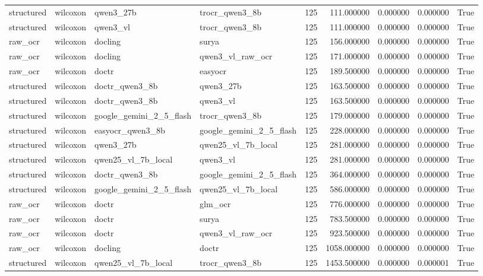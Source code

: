 \begin{tabular}{llllrrrrr}
structured & wilcoxon & qwen3\_27b & trocr\_qwen3\_8b & 125 & 111.000000 & 0.000000 & 0.000000 & True \\
structured & wilcoxon & qwen3\_vl & trocr\_qwen3\_8b & 125 & 111.000000 & 0.000000 & 0.000000 & True \\
raw\_ocr & wilcoxon & docling & surya & 125 & 156.000000 & 0.000000 & 0.000000 & True \\
raw\_ocr & wilcoxon & docling & qwen3\_vl\_raw\_ocr & 125 & 171.000000 & 0.000000 & 0.000000 & True \\
raw\_ocr & wilcoxon & doctr & easyocr & 125 & 189.500000 & 0.000000 & 0.000000 & True \\
structured & wilcoxon & doctr\_qwen3\_8b & qwen3\_27b & 125 & 163.500000 & 0.000000 & 0.000000 & True \\
structured & wilcoxon & doctr\_qwen3\_8b & qwen3\_vl & 125 & 163.500000 & 0.000000 & 0.000000 & True \\
structured & wilcoxon & google\_gemini\_2\_5\_flash & trocr\_qwen3\_8b & 125 & 179.000000 & 0.000000 & 0.000000 & True \\
structured & wilcoxon & easyocr\_qwen3\_8b & google\_gemini\_2\_5\_flash & 125 & 228.000000 & 0.000000 & 0.000000 & True \\
structured & wilcoxon & qwen3\_27b & qwen25\_vl\_7b\_local & 125 & 281.000000 & 0.000000 & 0.000000 & True \\
structured & wilcoxon & qwen25\_vl\_7b\_local & qwen3\_vl & 125 & 281.000000 & 0.000000 & 0.000000 & True \\
structured & wilcoxon & doctr\_qwen3\_8b & google\_gemini\_2\_5\_flash & 125 & 364.000000 & 0.000000 & 0.000000 & True \\
structured & wilcoxon & google\_gemini\_2\_5\_flash & qwen25\_vl\_7b\_local & 125 & 586.000000 & 0.000000 & 0.000000 & True \\
raw\_ocr & wilcoxon & doctr & glm\_ocr & 125 & 776.000000 & 0.000000 & 0.000000 & True \\
raw\_ocr & wilcoxon & doctr & surya & 125 & 783.500000 & 0.000000 & 0.000000 & True \\
raw\_ocr & wilcoxon & doctr & qwen3\_vl\_raw\_ocr & 125 & 923.500000 & 0.000000 & 0.000000 & True \\
raw\_ocr & wilcoxon & docling & doctr & 125 & 1058.000000 & 0.000000 & 0.000000 & True \\
structured & wilcoxon & qwen25\_vl\_7b\_local & trocr\_qwen3\_8b & 125 & 1453.500000 & 0.000000 & 0.000001 & True \\

\end{tabular}
